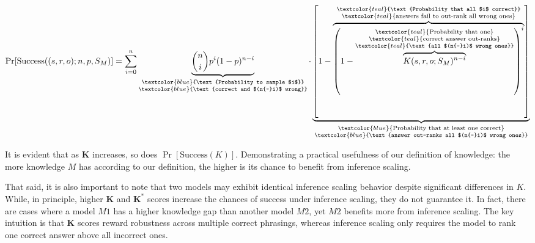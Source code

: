 \begin{equation}
\Pr[\text{Success}((s, r, o); n, p, S_M)] =
\sum_{i=0}^{n} 
\underbrace{\binom{n}{i} p^i (1 - p)^{n-i}}_{\substack{\textcolor{blue}{\text{Probability to sample $i$}} \\ \textcolor{blue}{\text{correct and $(n{-}i)$ wrong}}}} \cdot
\underbrace{\left[
    1 - 
    \overbrace{
        \left(
            1 - 
            \overbrace{K(s, r, o; S_M)^{n-i}}^{\substack{\textcolor{teal}{\text{Probability that one}} \\ \textcolor{teal}{\text{correct answer out-ranks}} \\ \textcolor{teal}{\text{all $(n{-}i)$ wrong ones}}}}
        \right)^i
    }^{\substack{\textcolor{teal}{\text{Probability that all $i$ correct}} \\ \textcolor{teal}{\text{answers fail to out-rank all wrong ones}}}}
\right]}_{\substack{\textcolor{blue}{\text{Probability that at least one correct}} \\ \textcolor{blue}{\text{answer out-ranks all $(n{-}i)$ wrong ones}}}}
\end{equation}





It is evident that as $\mathbf{K}$ increases, so does $\Pr[\text{Success}(K)]$. Demonstrating a practical usefulness of our definition of knowledge: the more knowledge $M$ has according to our definition, the higher is its chance to benefit from inference scaling. 

That said, it is also important to note that two models may exhibit identical inference scaling behavior despite significant differences in $K$. While, in principle, higher $\mathbf{K}$ and $\mathbf{K^\ast}$ scores increase the chances of success under inference scaling, they do not guarantee it. In fact, there are cases where a model $M1$ has a higher knowledge gap than another model $M2$, yet $M2$ benefits more from inference scaling. The key intuition is that $\mathbf{K}$ scores reward robustness across multiple correct phrasings, whereas inference scaling only requires the model to rank one correct answer above all incorrect ones.

